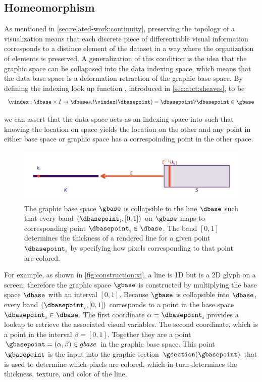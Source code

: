 \documentclass[journal]{IEEEtran}
\theoremstyle{definition}
\theoremstyle{remark}
\begin{document}
\subsection{Homeomorphism}
As mentioned in \autoref{sec:related-work:continuity}, preserving the topology of a visualization means that each discrete piece of differentiable visual information corresponds to a distince element of the dataset\cite{ziemkiewiczEmbeddingInformationVisualization2009} in a way where the organization of elements is preserved. A generalization of this condition is the idea that the graphic space can be collapased into the data indexing space, which means that the data base space is a deformation retraction of the graphic base space\cite{hatcherAlgebraicTopology2002}. By defining the indexing look up function \vindex, introduced in \autoref{sec:atct:sheaves}, to be
\begin{equation}
  \vindex: \dbase \times I \rightarrow \dbase s.t \vindex(\dbasepoint) = \dbasepoint \forall \dbasepoint \in \gbase
\end{equation}

we can assert that the data space \dbase acts as an indexing space into \gbase such that knowing the location on space yields the location on the other and any point in either base space or graphic space has a correspoinding point in the other space.
\begin{figure}[H]
  \includegraphics[width=1\columnwidth]{deform_retract.png}
  \caption{The graphic base space $\gbase$ is collapsible to the line $\dbase$ such that every band $(\dbasepoint_i, [0,1])$ on $\gbase$ maps to corresponding point $\dbasepoint_i \in \dbase$. The band $[0,1]$ determines the thickness of a rendered line for a given point $\dbasepoint_{i}$ by specifying how pixels corresponding to that point are colored. \label{fig:construction:xi}}
\end{figure}

For example, as shown in \autoref{fig:construction:xi}, a line is 1D but is a 2D glyph on a screen; therefore the graphic space $\gbase$ is constructed by multiplying the base space $\dbase$ with an interval $[0,1]$. Because $\gbase$ is collapsible into $\dbase$, every band $(\dbasepoint_i, [0,1])$ corresponds to a point in the base space $\dbasepoint_i \in \dbase$. The first coordinate $\alpha=\dbasepoint_i$ provides a lookup to retrieve the associated visual variables. The second coordinate, which is a point in the interval $\beta=[0,1]$. Together they are a point $\gbasepoint=(\alpha,\beta) \in gbase$ in the graphic base space. This point $\gbasepoint$ is the input into the graphic section $\gsection(\gbasepoint)$ that is used to determine which pixels are colored, which in turn determines the thickness, texture, and color of the line.
\end{document}
